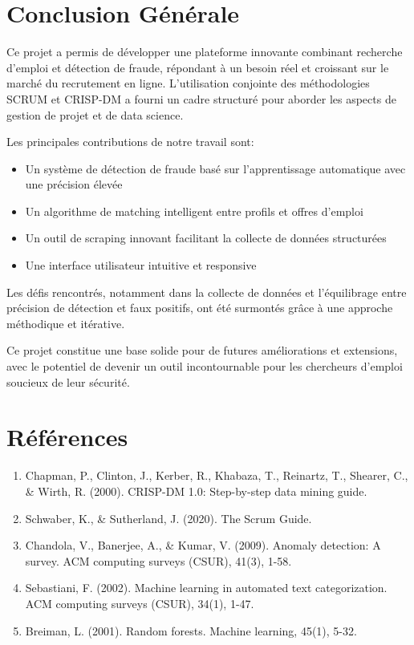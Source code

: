 \documentclass[10pt,a4paper,twocolumn]{article}
\begin{document}
\section{Conclusion Générale}
Ce projet a permis de développer une plateforme innovante combinant recherche d'emploi et détection de fraude, répondant à un besoin réel et croissant sur le marché du recrutement en ligne. L'utilisation conjointe des méthodologies SCRUM et CRISP-DM a fourni un cadre structuré pour aborder les aspects de gestion de projet et de data science.

Les principales contributions de notre travail sont:
\begin{itemize}
    \item Un système de détection de fraude basé sur l'apprentissage automatique avec une précision élevée
    \item Un algorithme de matching intelligent entre profils et offres d'emploi
    \item Un outil de scraping innovant facilitant la collecte de données structurées
    \item Une interface utilisateur intuitive et responsive
\end{itemize}

Les défis rencontrés, notamment dans la collecte de données et l'équilibrage entre précision de détection et faux positifs, ont été surmontés grâce à une approche méthodique et itérative.

Ce projet constitue une base solide pour de futures améliorations et extensions, avec le potentiel de devenir un outil incontournable pour les chercheurs d'emploi soucieux de leur sécurité.

\section*{Références}
\begin{enumerate}
    \item Chapman, P., Clinton, J., Kerber, R., Khabaza, T., Reinartz, T., Shearer, C., \& Wirth, R. (2000). CRISP-DM 1.0: Step-by-step data mining guide.
    \item Schwaber, K., \& Sutherland, J. (2020). The Scrum Guide.
    \item Chandola, V., Banerjee, A., \& Kumar, V. (2009). Anomaly detection: A survey. ACM computing surveys (CSUR), 41(3), 1-58.
    \item Sebastiani, F. (2002). Machine learning in automated text categorization. ACM computing surveys (CSUR), 34(1), 1-47.
    \item Breiman, L. (2001). Random forests. Machine learning, 45(1), 5-32.
\end{enumerate}
\end{document}

